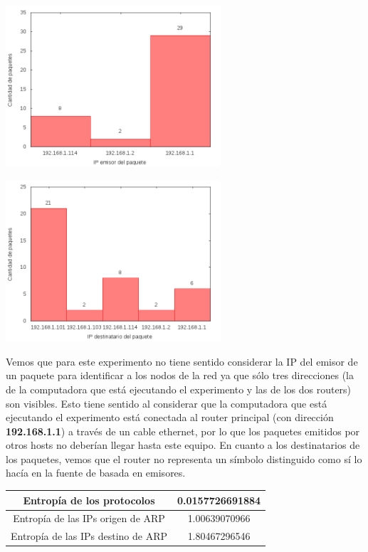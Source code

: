 \begin{minipage}{8cm}
  \centering
  \includegraphics[width=8cm]{../mediciones/home-eth-10/home-eth-10IpsSrcArp.png}
\end{minipage}%
\begin{minipage}{8cm}
  \centering
  \includegraphics[width=8cm]{../mediciones/home-eth-10/home-eth-10IpsDstArp.png}
\end{minipage}

Vemos que para este experimento no tiene sentido considerar la IP del emisor de un paquete para identificar a los nodos de la red ya que sólo tres direcciones
(la de la computadora que está ejecutando el experimento y las de los dos routers) son visibles. Esto tiene sentido al considerar que la computadora que
está ejecutando el experimento está conectada al router principal (con dirección \textbf{192.168.1.1}) a través de un cable ethernet, por lo que los paquetes emitidos
por otros hosts no deberían llegar hasta este equipo. En cuanto a los destinatarios de los paquetes, vemos que el router no representa un símbolo distinguido
como sí lo hacía en la fuente de basada en emisores.

\begin{center}
\begin{tabular}{|c||c|}
\hline
Entropía de los protocolos & 0.0157726691884  \\
\hline
Entropía de las IPs origen de ARP & 1.00639070966  \\
\hline
Entropía de las IPs destino de ARP & 1.80467296546 \\
\hline
\end{tabular}
\end{center}

